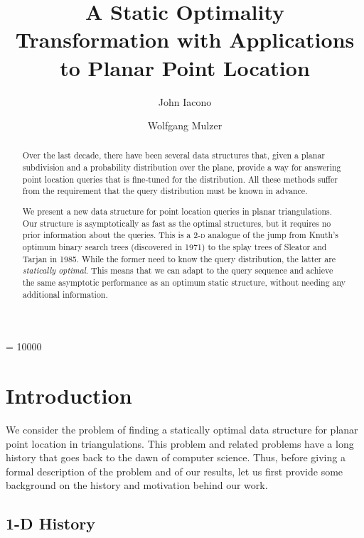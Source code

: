 \documentclass[11pt]{article}
\title{A Static Optimality Transformation with Applications\\ 
to Planar Point Location}
\author{
John Iacono \and Wolfgang Mulzer
}
\begin{document}
\widowpenalty = 10000

\maketitle

\begin{abstract} 
Over the last decade, there have been several data
structures that, given a planar subdivision and a probability 
distribution over the 
plane, provide a way for answering point location queries that is 
fine-tuned for the 
distribution. All these  methods suffer from the requirement that the query
distribution must be known in advance. 

We present a new data structure for point location queries in 
planar triangulations. Our structure is asymptotically as
fast as the optimal structures, but it requires no prior
information about the queries. 
This is a \textsc{2-d} analogue of the jump from Knuth's
optimum binary search trees (discovered in 1971) to the splay trees of 
Sleator and Tarjan in 1985. While the former need to know the
query distribution, the latter are \emph{statically optimal}.
This means that we 
can adapt to the query sequence and 
achieve the same asymptotic performance as an
optimum static structure, without needing any 
additional information.  
\end{abstract}







\section{Introduction}

We consider the problem of finding a statically optimal data structure
for planar point location in triangulations. This problem and related
problems have a long history that goes back to the dawn of computer science.
Thus, before giving a formal description of the problem and of our results,
let us first provide some background on the history and motivation behind
our work.

\subsection{{1-D} History}
\end{document}
